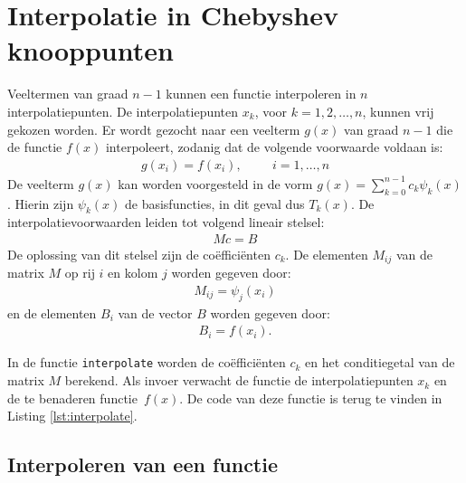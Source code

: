\documentclass[a4paper, 12pt, titlepage, fleqn]{article}
\begin{document}
\section{Interpolatie in Chebyshev knooppunten}
\label{sec:interpolatie}
Veeltermen van graad $n-1$ kunnen een functie interpoleren in $n$ interpolatiepunten. De interpolatiepunten $x_k$, voor $k = 1,2,\ldots,n$, kunnen vrij gekozen worden. Er wordt gezocht naar een veelterm $g(x)$ van graad $n-1$ die de functie $f(x)$ interpoleert, zodanig dat de volgende voorwaarde voldaan is:
\begin{align*}
g(x_i) = f(x_i), \hspace{1cm} i = 1,\ldots,n
\end{align*}
De veelterm $g(x)$ kan worden voorgesteld in de vorm $g(x) = \sum_{k=0}^{n-1}c_k\psi_k(x)$. Hierin zijn $\psi_k(x)$ de basisfuncties, in dit geval dus $T_k(x)$. De interpolatievoorwaarden leiden tot volgend lineair stelsel:
\begin{align}
Mc = B
\label{eq:matrixM}
\end{align}
De oplossing van dit stelsel zijn de co\"effici\"enten $c_k$. De elementen $M_{ij}$ van de matrix $M$ op rij $i$ en kolom $j$ worden gegeven door:
\begin{align*}
M_{ij} = \psi_j(x_i)
\end{align*}
en de elementen $B_i$ van de vector $B$ worden gegeven door:
\begin{align*}
B_i = f(x_i).
\end{align*}

In de functie \texttt{interpolate} worden de co\"effici\"enten $c_k$ en het conditiegetal van de matrix $M$ berekend. Als invoer verwacht de functie de interpolatiepunten $x_k$ en de te benaderen functie~$f(x)$. De code van deze functie is terug te vinden in Listing \ref{lst:interpolate}.



\subsection{Interpoleren van een functie}
\end{document}
